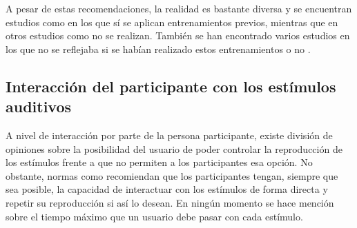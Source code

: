\documentclass[11pt,a4paper]{book}
\begin{document}
            A pesar de estas recomendaciones, la realidad es bastante diversa y se encuentran estudios como \cite{1995GASoulodre,1999JBradley, 2005IWitew, 2010FMartellotta, 2010MVigeant, 1997SCarlile, 2011VEmiya, 2016BPostma, 2019ZShao, 2019VRajala, 2019MShiell, 2019JGroose, Braun2004, delaPrida2019, delaPrida2021} en los que sí se aplican entrenamientos previos, mientras que en otros estudios como \cite{Brockhoff2009,2019LKritly,2019DMorikawa, 2019DJSchlit} no se realizan. También se han encontrado varios estudios en los que no se reflejaba si se habían realizado estos entrenamientos o no \cite{2002PZahorik, 2016SKlockgether, 2019GPulvirenti,2019MNowak, 2019MYamada, 2019JLee, Christensen2009}.
    
	    \subsection{Interacción del participante con los estímulos auditivos}
    		A nivel de interacción por parte de la persona participante, existe división de opiniones sobre la posibilidad del usuario de poder controlar la reproducción de los estímulos \cite{1995GASoulodre, 2010FMartellotta, 2010MVigeant, 2011VEmiya,2019DMorikawa} frente a \cite{1999JBradley, 2002PZahorik, 2005IWitew, 2016SKlockgether, 2019VRajala, 2019VHongisto} que no permiten a los participantes esa opción. No obstante, normas como \cite{UIT1116,UIT1534, UIT1284,EBU3286, UIT1285, UIT1286} recomiendan que los participantes tengan, siempre que sea posible, la capacidad de interactuar con los estímulos de forma directa y repetir su reproducción si así lo desean. En ningún momento se hace mención sobre el tiempo máximo que un usuario debe pasar con cada estímulo.
	
\end{document}
